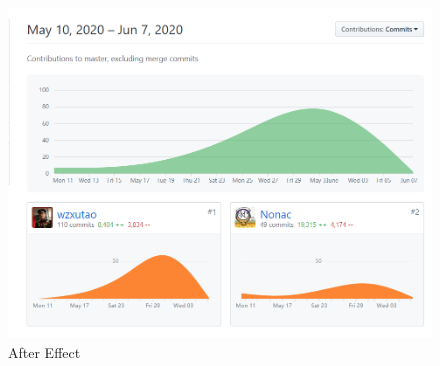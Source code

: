 \documentclass[11pt]{article}
\begin{document}
\begin{spacing}{1.0}
	\begin{figure}[H]
		\centering
		\includegraphics[scale=0.7]{figures/github.png}
		\caption{After Effect}
		\label{fig:15}
	\end{figure}
	
	
\end{spacing}	
	
\end{document}
